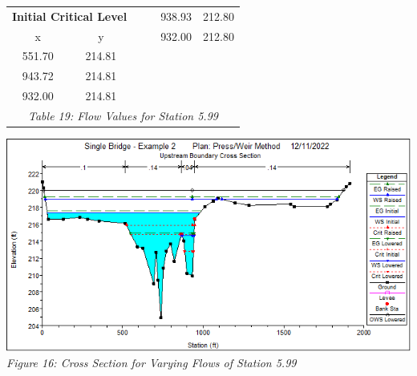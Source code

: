 \begin{center}
\begin{tabular}{|cc|cc|cc|}
    \multicolumn{2}{|c|}{\textbf{Initial Critical Level }}   &         &                                            & 938.93  & 212.80                                             \\ 
    \cline{1-2}
    x      & y                                               &         &                                            & 932.00  & 212.80                                             \\
    551.70 & 214.81                                          &         &                                            &         &                                                    \\
    943.72 & 214.81                                          &         &                                            &         &                                                    \\
    932.00 & 214.81                                          &         &                                            &         &                                                    \\
    \hline\multicolumn{6}{c}{\emph{Table 19: Flow Values for Station 5.99}}
\end{tabular}
\vspace{5mm}
\begin{center}
    \includegraphics[scale=0.7, frame]{fig16.png}
    \\\emph{Figure 16: Cross Section for Varying Flows of Station 5.99}\\
\end{center}
\newpage

\end{center}
